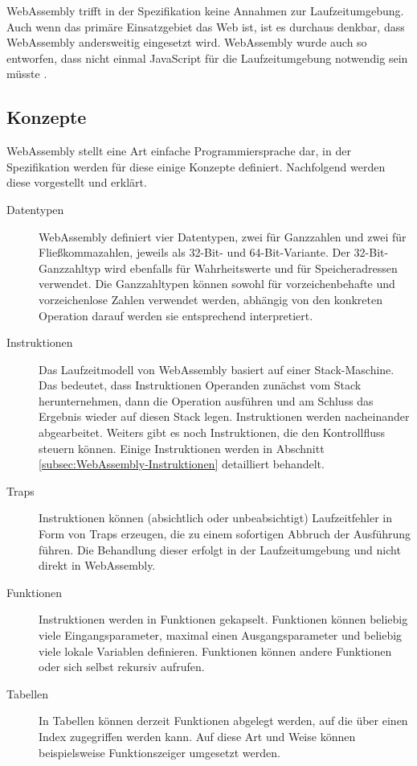 WebAssembly trifft in der Spezifikation keine Annahmen zur Laufzeitumgebung. Auch wenn das primäre Einsatzgebiet das Web ist, ist es durchaus denkbar, dass WebAssembly andersweitig eingesetzt wird. WebAssembly wurde auch so entworfen, dass nicht einmal JavaScript für die Laufzeitumgebung notwendig sein müsste \cite{WebAssemblyWebsite}.

\subsection{Konzepte}
WebAssembly stellt eine Art einfache Programmiersprache dar, in der Spezifikation werden für diese einige Konzepte \cite{WebAssemblySpecification} definiert. Nachfolgend werden diese vorgestellt und erklärt.

\begin{description}
    \item[Datentypen] WebAssembly definiert vier Datentypen, zwei für Ganzzahlen und zwei für Fließkommazahlen, jeweils als 32-Bit- und 64-Bit-Variante. Der 32-Bit-Ganz\-zahl\-typ wird ebenfalls für Wahrheitswerte und für Speicheradressen verwendet. Die Ganzzahltypen können sowohl für vorzeichenbehafte und vorzeichenlose Zahlen verwendet werden, abhängig von den konkreten Operation darauf werden sie entsprechend interpretiert.
    \item[Instruktionen] Das Laufzeitmodell von WebAssembly basiert auf einer Stack-Ma\-schi\-ne. Das bedeutet, dass Instruktionen Operanden zunächst vom Stack herunternehmen, dann die Operation ausführen und am Schluss das Ergebnis wieder auf diesen Stack legen. Instruktionen werden nacheinander abgearbeitet. Weiters gibt es noch Instruktionen, die den Kontrollfluss steuern können. Einige Instruktionen werden in Abschnitt \ref{subsec:WebAssembly-Instruktionen} detailliert behandelt.
    \item[Traps] Instruktionen können (absichtlich oder unbeabsichtigt) Laufzeitfehler in Form von Traps erzeugen, die zu einem sofortigen Abbruch der Ausführung führen. Die Behandlung dieser erfolgt in der Laufzeitumgebung und nicht direkt in WebAssembly.
    \item[Funktionen] Instruktionen werden in Funktionen gekapselt. Funktionen können beliebig viele Eingangsparameter, maximal einen Ausgangsparameter und beliebig viele lokale Variablen definieren. Funktionen können andere Funktionen oder sich selbst rekursiv aufrufen.
    \item[Tabellen] In Tabellen können derzeit Funktionen abgelegt werden, auf die über einen Index zugegriffen werden kann. Auf diese Art und Weise können beispielsweise Funktionszeiger umgesetzt werden. 

\end{description}
